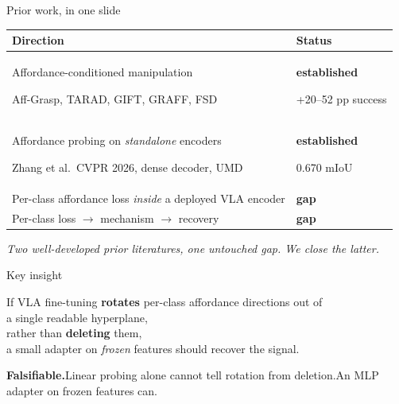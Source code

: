 \documentclass[10pt,aspectratio=169]{beamer}
\newcommand{\hl}[1]{\textcolor{emph}{\textbf{#1}}}
\newcommand{\acc}[1]{\textcolor{accent}{\textbf{#1}}}
\begin{document}
\begin{frame}{Prior work, in one slide}
  \begin{tabular}{p{} p{}}
    \toprule
    Direction & Status \\
    \midrule
    Affordance-conditioned manipulation\par
      {\small\color{muted}Aff-Grasp, TARAD, GIFT, GRAFF, FSD}
      & \acc{established}\par {\small\color{muted}+20--52 pp success} \\[0.5em]
    Affordance probing on \emph{standalone} encoders\par
      {\small\color{muted}Zhang et al.\ CVPR 2026, dense decoder, UMD}
      & \acc{established}\par {\small\color{muted}0.670 mIoU} \\[0.5em]
    Per-class affordance loss \emph{inside} a deployed VLA encoder
      & \hl{gap} \\[0.3em]
    Per-class loss $\to$ mechanism $\to$ recovery
      & \hl{gap} \\
    \bottomrule
  \end{tabular}

  \vspace{0.8em}
  {\small\itshape Two well-developed prior literatures, one untouched gap. We close the latter.}
\end{frame}

\begin{frame}{Key insight}
  \vspace{1.0em}
  \begin{center}\large
  If VLA fine-tuning \hl{rotates} per-class affordance directions out of\\[0.3em] a single readable hyperplane,\\[0.3em] rather than \hl{deleting} them,\\[0.6em]
  a small adapter on \emph{frozen} features should recover the signal.
  \end{center}

  \vspace{1.2em}
  \begin{center}\small
    \textbf{Falsifiable.}\quad Linear probing alone cannot tell rotation from deletion.\quad An MLP adapter on frozen features can.
  \end{center}
\end{frame}
\end{document}
